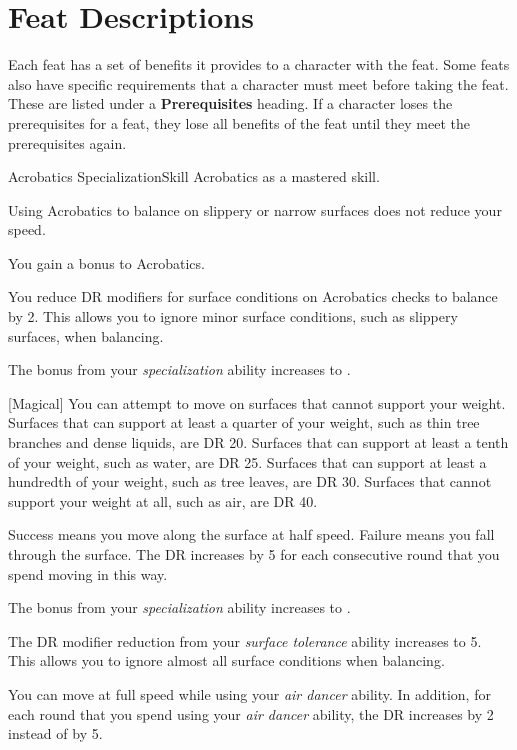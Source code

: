    \section{Feat Descriptions}
        Each feat has a set of benefits it provides to a character with the feat.
        Some feats also have specific requirements that a character must meet before taking the feat.
        These are listed under a \textbf{Prerequisites} heading.
        If a character loses the prerequisites for a feat, they lose all benefits of the feat until they meet the prerequisites again.

    \begin{feat}{Acrobatics Specialization}{Skill}
        \featpre Acrobatics as a mastered skill.

         Using Acrobatics to balance on slippery or narrow surfaces does not reduce your speed.

         You gain a  bonus to Acrobatics.

         You reduce DR modifiers for surface conditions on Acrobatics checks to balance by 2.
        This allows you to ignore minor surface conditions, such as slippery surfaces, when balancing.

         The bonus from your \textit{specialization} ability increases to .

        [Magical] You can attempt to move on surfaces that cannot support your weight.
        Surfaces that can support at least a quarter of your weight, such as thin tree branches and dense liquids, are DR 20.
        Surfaces that can support at least a tenth of your weight, such as water, are DR 25.
        Surfaces that can support at least a hundredth of your weight, such as tree leaves, are DR 30.
        Surfaces that cannot support your weight at all, such as air, are DR 40.

        Success means you move along the surface at half speed.
        Failure means you fall through the surface.
        The DR increases by 5 for each consecutive round that you spend moving in this way.

         The bonus from your \textit{specialization} ability increases to .

         The DR modifier reduction from your \textit{surface tolerance} ability increases to 5.
        This allows you to ignore almost all surface conditions when balancing.

         You can move at full speed while using your \textit{air dancer} ability.
        In addition, for each round that you spend using your \textit{air dancer} ability, the DR increases by 2 instead of by 5.
    \end{feat}

